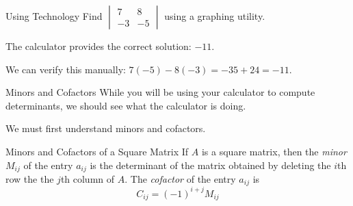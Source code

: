 \documentclass[t]{beamer}
\newcommand{\fp}[1]{\left({#1}\right)} %
\begin{document}
	\begin{frame}{Using Technology}
		Find $\begin{vmatrix}
		7 & 8 \\ -3 & -5
		\end{vmatrix}$ using a graphing utility. \pause
		
		The calculator provides the correct solution: $-11$.
		
		We can verify this manually: $7(-5) - 8(-3) = -35 + 24 = -11$.
	\end{frame}

	\begin{frame}{Minors and Cofactors}
		While you will be using your calculator to compute determinants, we should see what the calculator is doing.
		
		We must first understand minors and cofactors.
		
		\begin{block}{Minors and Cofactors of a Square Matrix}
			If $A$ is a square matrix, then the \textit{minor} $M_{ij}$ of the entry $a_{ij}$ is the determinant of the matrix obtained by deleting the $i$th row the the $j$th column of $A$. The \textit{cofactor} of the entry $a_{ij}$ is $$C_{ij} = \fp{-1}^{i+j}M_{ij}$$
		\end{block}
	\end{frame}
\end{document}
